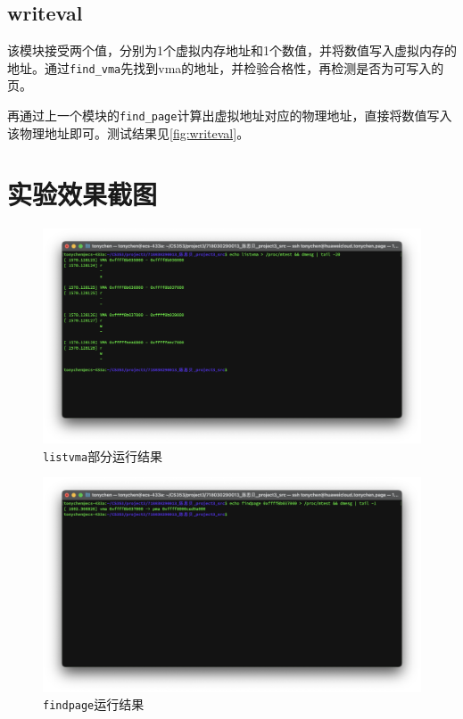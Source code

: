 \documentclass[UTF8]{ctexrep}
\begin{document}
    \subsection{writeval}

    该模块接受两个值，分别为1个虚拟内存地址和1个数值，并将数值写入虚拟内存的地址。通过\texttt{find\_vma}先找到vma的地址，并检验合格性，再检测是否为可写入的页。

    再通过上一个模块的\texttt{find\_page}计算出虚拟地址对应的物理地址，直接将数值写入该物理地址即可。测试结果见\ref{fig:writeval}。\\

    \section{实验效果截图}

    \begin{figure}[h!]
        \centering
        \includegraphics[width=15cm,keepaspectratio]{images/listvma.png}
        \caption{\texttt{listvma}部分运行结果}
        \label{fig:listvma}
    \end{figure}

    \begin{figure}[h!]
        \centering
        \includegraphics[width=15cm,keepaspectratio]{images/findpage.png}
        \caption{\texttt{findpage}运行结果}
        \label{fig:findpage}
    \end{figure}
\end{document}
